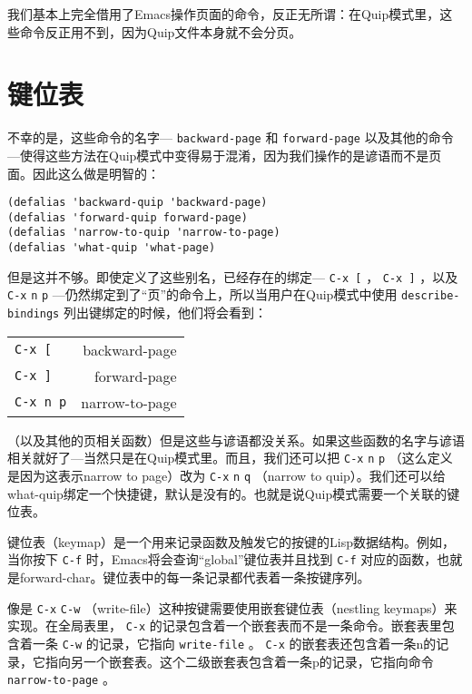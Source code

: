 我们基本上完全借用了Emacs操作页面的命令，反正无所谓：在Quip模式里，这些命令反正用不到，因为Quip文件本身就不会分页。

\section{键位表}
\label{section:09-Keymaps}

不幸的是，这些命令的名字--- \texttt{backward-page} 和 \texttt{forward-page} 以及其他的命令---使得这些方法在Quip模式中变得易于混淆，因为我们操作的是谚语而不是页面。因此这么做是明智的：

\begin{verbatim}
(defalias 'backward-quip 'backward-page)
(defalias 'forward-quip forward-page)
(defalias 'narrow-to-quip 'narrow-to-page)
(defalias 'what-quip 'what-page)
\end{verbatim}

但是这并不够。即使定义了这些别名，已经存在的绑定--- \verb|C-x [| ， \verb|C-x ]| ，以及 \verb|C-x| \verb|n| \verb|p| ---仍然绑定到了“页”的命令上，所以当用户在Quip模式中使用 \texttt{describe-bindings} 列出键绑定的时候，他们将会看到：

\begin{tabular}{lr}
  \verb|C-x [| & backward-page \\
  \verb|C-x ]| & forward-page \\
  \verb|C-x n p| & narrow-to-page
\end{tabular}

（以及其他的页相关函数）但是这些与谚语都没关系。如果这些函数的名字与谚语相关就好了---当然只是在Quip模式里。而且，我们还可以把 \verb|C-x| \verb|n| \verb|p| （这么定义是因为这表示narrow to page）改为 \verb|C-x| \verb|n| \verb|q| （narrow to quip）。我们还可以给what-quip绑定一个快捷键，默认是没有的。也就是说Quip模式需要一个关联的键位表。

键位表（keymap）是一个用来记录函数及触发它的按键的Lisp数据结构。例如，当你按下 \verb|C-f| 时，Emacs将会查询“global”键位表并且找到 \verb|C-f| 对应的函数，也就是forward-char。键位表中的每一条记录都代表着一条按键序列。

像是 \verb|C-x| \verb|C-w| （write-file）这种按键需要使用嵌套键位表（nestling keymaps）来实现。在全局表里， \verb|C-x| 的记录包含着一个嵌套表而不是一条命令。嵌套表里包含着一条 \verb|C-w| 的记录，它指向 \texttt{write-file} 。 \verb|C-x| 的嵌套表还包含着一条n的记录，它指向另一个嵌套表。这个二级嵌套表包含着一条p的记录，它指向命令 \texttt{narrow-to-page} 。

